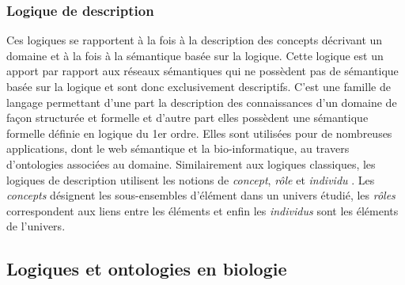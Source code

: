 \subsubsection{Logique de description}

Ces logiques se rapportent à la fois à la description des concepts décrivant un domaine et à la fois à la sémantique basée sur la logique. Cette logique est un apport par rapport aux réseaux sémantiques qui ne possèdent pas de sémantique basée sur la logique et sont donc exclusivement descriptifs. C'est une famille de langage permettant d'une part la description des connaissances d'un domaine de façon structurée et formelle et d'autre part elles possèdent une sémantique formelle définie en logique du 1er ordre. Elles sont utilisées pour de nombreuses applications, dont le web sémantique et la bio-informatique, au travers d'ontologies associées au domaine. 
Similairement aux logiques classiques, les logiques de description utilisent les notions de \textit{concept}, \textit{rôle} et \textit{individu} \cite{baader2003description}. Les \textit{concepts} désignent les sous-ensembles d'élément dans un univers étudié, les \textit{rôles} correspondent aux liens entre les éléments et enfin les \textit{individus} sont les éléments de l'univers.


\subsection{Logiques et ontologies en biologie}

